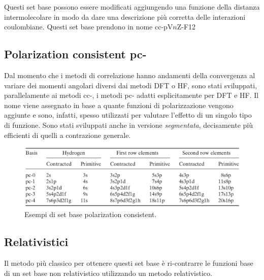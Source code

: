 \documentclass[oneside]{amsbook}
\numberwithin{section}{chapter}
\numberwithin{equation}{section}
\numberwithin{figure}{section}
\begin{document}
Questi set base possono essere modificati aggiungendo una funzione della distanza intermolecolare in modo da dare una descrizione più corretta delle interazioni coulombiane. Questi set base prendono in nome cc-pV$n$Z-F12


\subsection{Polarization consistent pc-}
Dal momento che i metodi di correlazione hanno andamenti della convergenza al variare dei momenti angolari diversi dai metodi DFT o HF, sono stati sviluppati, parallelamente ai metodi cc-, i metodi pc- adatti esplicitamente per DFT e HF.
Il nome viene assegnato in base a quante funzioni di polarizzazione vengono aggiunte e sono, infatti, spesso utilizzati per valutare l'effetto di un singolo tipo di funzione. Sono stati sviluppati anche in versione \emph{segmentata}, decisamente più efficienti di quelli a contrazione generale.

\begin{figure}[H]
\centering
\caption{Esempi di set base polarization consistent.}\label{crop}
\includegraphics[scale=0.3]{pc}
\end{figure}

\subsection{Relativistici }
Il metodo più classico per ottenere questi set base è ri-contrarre le funzioni base di un set base non relativistico utilizzando un metodo relativistico.
\end{document}
